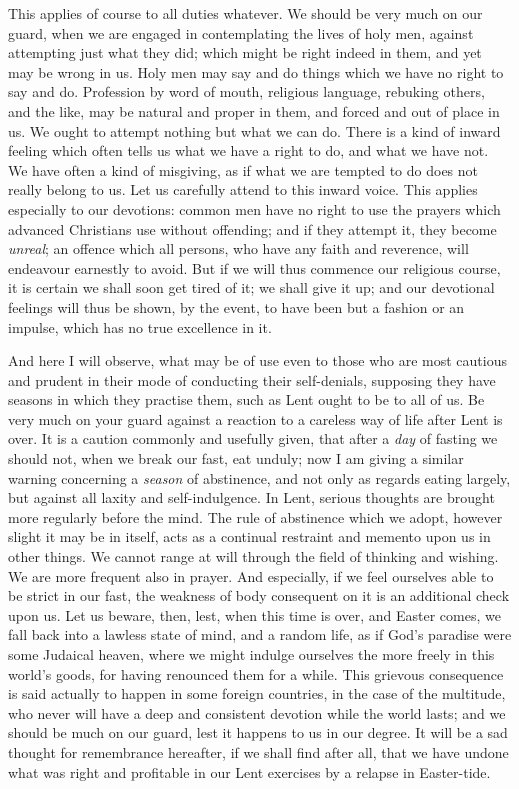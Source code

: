 This applies of course to all duties whatever. We should be very much
on our guard, when we are engaged in contemplating the lives of holy
men, against attempting just what they did; which might be right indeed
in them, and yet may be wrong in us. Holy men may say and do things
which we have no right to say and do. Profession by word of mouth,
religious language, rebuking others, and the like, may be natural and
proper in them, and forced and out of place in us. We ought to attempt
nothing but what we can do. There is a kind of inward feeling which
often tells us what we have a right to do, and what we have not. We have
often a kind of misgiving, as if what we are tempted to do does not
really belong to us. Let us carefully attend to this inward voice. This
applies especially to our devotions: common men have no right to use the
prayers which advanced Christians use without offending; and if they
attempt it, they become \emph{unreal}; an offence which all persons, who
have any faith and reverence, will endeavour earnestly to avoid. But if
we will thus commence our religious course, it is certain we shall soon
get tired of it; we shall give it up; and our devotional feelings will
thus be shown, by the event, to have been but a fashion or an impulse,
which has no true excellence in it.

And here I will observe, what may be of use even to those who are
most cautious and prudent in their mode of conducting their
self-denials, supposing they have seasons in which they practise them,
such as Lent ought to be to all of us. Be very much on your guard
against a reaction to a careless way of life after Lent is over. It is a
caution commonly and usefully given, that after a \emph{day} of fasting
we should not, when we break our fast, eat unduly; now I am giving a
similar warning concerning a \emph{season} of abstinence, and not only
as regards eating largely, but against all laxity and self-indulgence.
In Lent, serious thoughts are brought more regularly before the mind.
The rule of abstinence which we adopt, however slight it may be in
itself, acts as a continual restraint and memento upon us in other
things. We cannot range at will through the field of thinking and
wishing. We are more frequent also in prayer. And especially, if we feel
ourselves able to be strict in our fast, the weakness of body consequent
on it is an additional check upon us. Let us beware, then, lest, when
this time is over, and Easter comes, we fall back into a lawless state
of mind, and a random life, as if God's paradise were some Judaical
heaven, where we might indulge ourselves the more freely in this world's
goods, for having renounced them for a while. This grievous consequence
is said actually to happen in some foreign countries, in the case of the
multitude, who never will have a deep and consistent devotion while the
world lasts; and we should be much on our guard, lest it happens to us
in our degree. It will be a sad thought for remembrance hereafter, if we
shall find after all, that we have undone what was right and profitable
in our Lent exercises by a relapse in Easter-tide.

